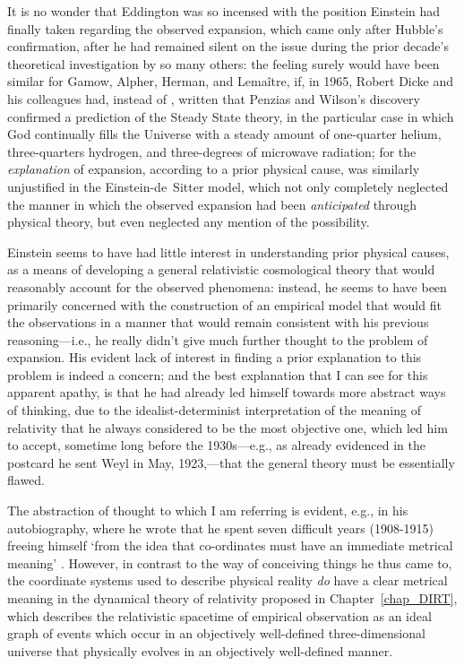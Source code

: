 It is no wonder that Eddington was so incensed with the position Einstein had finally taken regarding the observed expansion, which came only after Hubble's confirmation, after he had remained silent on the issue during the prior decade's theoretical investigation by so many others: the feeling surely would have been similar for Gamow, Alpher, Herman, and Lema\^{i}tre, if, in 1965, Robert Dicke and his colleagues had, instead of \cite{Dicke1965}, written that Penzias and Wilson's discovery confirmed a prediction of the Steady State theory, in the particular case in which God continually fills the Universe with a steady amount of one-quarter helium, three-quarters hydrogen, and three-degrees of microwave radiation; for the \textit{explanation} of expansion, according to a prior physical cause, was similarly unjustified in the Einstein-de~Sitter model, which not only completely neglected the manner in which the observed expansion had been \textit{anticipated} through physical theory, but even neglected any mention of the possibility.

Einstein seems to have had little interest in understanding prior physical causes, as a means of developing a general relativistic cosmological theory that would reasonably account for the observed phenomena: instead, he seems to have been primarily concerned with the construction of an empirical model that would fit the observations in a manner that would remain consistent with his previous reasoning---i.e., he really didn't give much further thought to the problem of expansion. His evident lack of interest in finding a prior explanation to this problem is indeed a concern; and the best explanation that I can see for this apparent apathy, is that he had already led himself towards more abstract ways of thinking, due to the idealist-determinist interpretation of the meaning of relativity that he always considered to be the most objective one, which led him to accept, sometime long before the 1930s---e.g., as already evidenced in the postcard he sent Weyl in May, 1923,---that the general theory must be essentially flawed.

The abstraction of thought to which I am referring is evident, e.g., in his autobiography, where he wrote that he spent seven difficult years (1908-1915) freeing himself `from the idea that co-ordinates must have an immediate metrical meaning' \cite{Einstein1951}. However, in contrast to the way of conceiving things he thus came to, the coordinate systems used to describe physical reality \textit{do} have a clear metrical meaning in the dynamical theory of relativity proposed in Chapter~\ref{chap_DIRT}, which describes the relativistic spacetime of empirical observation as an ideal graph of events which occur in an objectively well-defined three-dimensional universe that physically evolves in an objectively well-defined manner.

